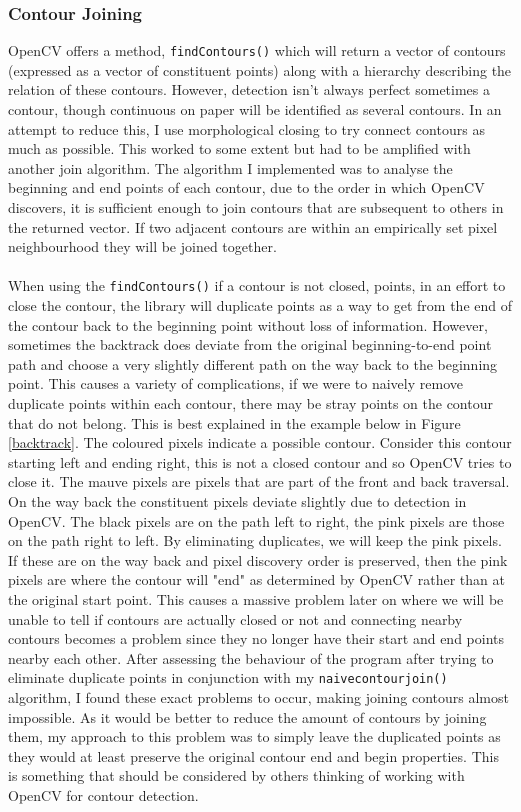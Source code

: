 \documentclass[11pt]{article}
\begin{document}
\subsubsection{Contour Joining}
OpenCV offers a method, \texttt{findContours()} which will return a
vector of contours (expressed as a vector of constituent points) along with
a hierarchy describing the relation of these contours. However, detection
isn't always perfect sometimes a contour, though continuous on paper
will be identified as several contours. In an attempt to reduce this, I 
use morphological closing to try connect contours as much as possible.
This worked to some extent but had to be amplified with another join
algorithm. The algorithm I implemented was to analyse the beginning and end points
of each contour, due to the order in which OpenCV discovers, it is sufficient 
enough to join contours that are subsequent to others in the returned
vector. If two adjacent contours are within an empirically set pixel
neighbourhood they will be joined together. \\
\\
When using the \texttt{findContours()} if a contour is not closed,
points, in an effort to close the contour, the library will duplicate 
points as a way to get from the end of the contour back to the beginning
point without loss of information. However, sometimes the backtrack does
deviate from the original beginning-to-end point path and choose a very
slightly different path on the way back to the beginning point. This causes 
a variety of complications, if we were to naively remove duplicate points
within each contour, there may be stray points on the contour that do not
belong. This is best explained in the example below in Figure \ref{backtrack}.
The coloured pixels indicate a possible contour. Consider this contour
starting left and ending right, this is not a closed contour and
so OpenCV tries to close it. The mauve pixels are pixels that are part
of the front and back traversal. On the way back the constituent pixels
deviate slightly due to detection in OpenCV. The black pixels are
on the path left to right, the pink pixels are those on the path right to left.
By eliminating duplicates, we will keep the pink pixels. If these are on the
way back and pixel discovery order is preserved, then the pink pixels are
where the contour will "end" as determined by OpenCV rather than at the 
original start point. This causes a massive problem later on where we
will be unable to tell if contours are actually closed or not and connecting
nearby contours becomes a problem since they no longer have their
start and end points nearby each other. After assessing the behaviour of 
the program after trying to eliminate duplicate points in conjunction 
with my \texttt{naivecontourjoin()} algorithm, I found these exact
problems to occur, making joining contours almost impossible. As it
would be better to reduce the amount of contours by joining them, my approach
to this problem was to simply leave the duplicated points as they would 
at least preserve the original contour end and begin properties. This is
something that should be considered by others thinking of working with
OpenCV for contour detection.
\end{document}
